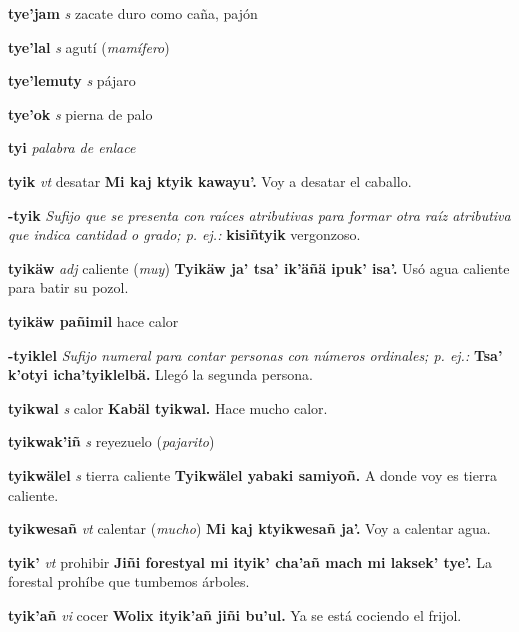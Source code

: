 \documentclass[10pt]{scrbook}
\newcommand{\entry}[1]{\textbf{#1}}
\newcommand{\nontranslationdef}[1]{\textit{#1}}
\newcommand{\partofspeech}[1]{\textit{#1}}
\newcommand{\spanishtranslation}[1]{#1}
\newcommand{\clarification}[1]{(\textit{#1})}
\newcommand{\cholexample}[1]{\textbf{#1}}
\newcommand{\exampletranslation}[1]{#1}
\begin{document}
\begin{multicols}{2}
\entry{tye'jam}
\partofspeech{s}
\spanishtranslation{zacate duro como caña, pajón}

\entry{tye'lal}
\partofspeech{s}
\spanishtranslation{agutí}
\clarification{mamífero}

\entry{tye'lemuty}
\partofspeech{s}
\spanishtranslation{pájaro}

\entry{tye'ok}
\partofspeech{s}
\spanishtranslation{pierna de palo}

\entry{tyi}
\nontranslationdef{palabra de enlace}

\entry{tyik}
\partofspeech{vt}
\spanishtranslation{desatar}
\cholexample{Mi kaj ktyik kawayu'.}
\exampletranslation{Voy a desatar el caballo.}

\entry{-tyik}
\nontranslationdef{Sufijo que se presenta con raíces atributivas para formar otra raíz atributiva que indica cantidad o grado; p. ej.:}
\cholexample{kisiñtyik}
\exampletranslation{vergonzoso.}

\entry{tyikäw}
\partofspeech{adj}
\spanishtranslation{caliente}
\clarification{muy}
\cholexample{Tyikäw ja' tsa' ik'äñä ipuk' isa'.}
\exampletranslation{Usó agua caliente para batir su pozol.}

\entry{tyikäw pañimil}
\spanishtranslation{hace calor}

\entry{-tyiklel}
\nontranslationdef{Sufijo numeral para contar personas con números ordinales; p. ej.:}
\cholexample{Tsa' k'otyi icha'tyiklelbä.}
\exampletranslation{Llegó la segunda persona.}

\entry{tyikwal}
\partofspeech{s}
\spanishtranslation{calor}
\cholexample{Kabäl tyikwal.}
\exampletranslation{Hace mucho calor.}

\entry{tyikwak'iñ}
\partofspeech{s}
\spanishtranslation{reyezuelo}
\clarification{pajarito}

\entry{tyikwälel}
\partofspeech{s}
\spanishtranslation{tierra caliente}
\cholexample{Tyikwälel yabaki samiyoñ.}
\exampletranslation{A donde voy es tierra caliente.}

\entry{tyikwesañ}
\partofspeech{vt}
\spanishtranslation{calentar}
\clarification{mucho}
\cholexample{Mi kaj ktyikwesañ ja'.}
\exampletranslation{Voy a calentar agua.}

\entry{tyik'}
\partofspeech{vt}
\spanishtranslation{prohibir}
\cholexample{Jiñi forestyal mi ityik' cha'añ mach mi laksek' tye'.}
\exampletranslation{La forestal prohíbe que tumbemos árboles.}

\entry{tyik'añ}
\partofspeech{vi}
\spanishtranslation{cocer}
\cholexample{Wolix ityik'añ jiñi bu'ul.}
\exampletranslation{Ya se está cociendo el frijol.}


\end{multicols}
\end{document}

